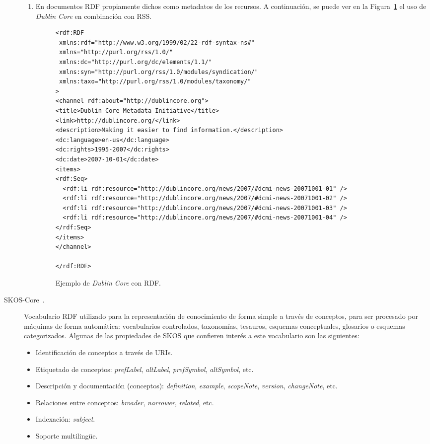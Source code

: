 \begin{description}
\begin{enumerate}
\item En documentos RDF propiamente dichos como metadatos de los recursos. A
continuación, se puede ver en la Figura~\ref{fig:rdf-dc-example} el uso de \textit{Dublin Core} en combinación con \gls{RSS}.

\begin{figure}[!htbp]
\centering
\begin{lstlisting}
<rdf:RDF
 xmlns:rdf="http://www.w3.org/1999/02/22-rdf-syntax-ns#"
 xmlns="http://purl.org/rss/1.0/"
 xmlns:dc="http://purl.org/dc/elements/1.1/"
 xmlns:syn="http://purl.org/rss/1.0/modules/syndication/"
 xmlns:taxo="http://purl.org/rss/1.0/modules/taxonomy/"
>
<channel rdf:about="http://dublincore.org">
<title>Dublin Core Metadata Initiative</title>
<link>http://dublincore.org/</link>
<description>Making it easier to find information.</description>
<dc:language>en-us</dc:language>
<dc:rights>1995-2007</dc:rights>
<dc:date>2007-10-01</dc:date>
<items>
<rdf:Seq>
  <rdf:li rdf:resource="http://dublincore.org/news/2007/#dcmi-news-20071001-01" />
  <rdf:li rdf:resource="http://dublincore.org/news/2007/#dcmi-news-20071001-02" />
  <rdf:li rdf:resource="http://dublincore.org/news/2007/#dcmi-news-20071001-03" />
  <rdf:li rdf:resource="http://dublincore.org/news/2007/#dcmi-news-20071001-04" />
</rdf:Seq>
</items>
</channel>

</rdf:RDF>
 \end{lstlisting} 
\label{fig:rdf-dc-example}
\caption{Ejemplo de \textit{Dublin Core} con RDF.}
\end{figure}

\end{enumerate}

\item[\gls{SKOS}-Core~\cite{SKOS-Core}.] Vocabulario RDF utilizado para la representación de conocimiento 
de forma simple a través de conceptos, para ser procesado por máquinas de forma
automática: vocabularios controlados, taxonomías, tesauros, esquemas
conceptuales, glosarios o esquemas categorizados. Algunas de las propiedades de SKOS que 
confieren interés a este vocabulario son las siguientes:
\begin{itemize}
\item Identificación de conceptos a través de URIs.
\item  Etiquetado de conceptos: \textit{prefLabel}, \textit{altLabel},
\textit{prefSymbol}, \textit{altSymbol}, etc.
\item Descripción y documentación (conceptos): \textit{definition}, \textit{example}, \textit{scopeNote},
\textit{version}, \textit{changeNote}, etc.
\item Relaciones entre conceptos: \textit{broader}, \textit{narrower},
\textit{related}, etc. 
\item Indexación: \textit{subject}.
\item Soporte multiling\"{u}e.
\end{itemize}


\end{description}
